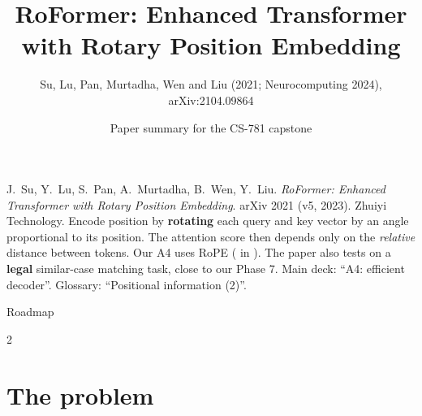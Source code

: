 \documentclass[aspectratio=169,11pt]{beamer}
\title[RoFormer / RoPE]{RoFormer: Enhanced Transformer with Rotary Position Embedding}
\subtitle{Su, Lu, Pan, Murtadha, Wen and Liu (2021; Neurocomputing 2024), arXiv:2104.09864}
\author[Paper summary]{Paper summary for the CS-781 capstone}
\date{}
\begin{document}
\begin{frame}\titlepage\end{frame}

\paperglance
{J.\ Su, Y.\ Lu, S.\ Pan, A.\ Murtadha, B.\ Wen, Y.\ Liu. \emph{RoFormer: Enhanced Transformer with Rotary Position Embedding}. arXiv 2021 (v5, 2023). Zhuiyi Technology.}
{Encode position by \textbf{rotating} each query and key vector by an angle proportional to its position. The attention score then depends only on the \emph{relative} distance between tokens.}
{Our A4 uses RoPE ( in ). The paper also tests on a \textbf{legal} similar-case matching task, close to our Phase 7.}
{Main deck: ``A4: efficient decoder''. Glossary: ``Positional information (2)''.}

\begin{frame}{Roadmap}
  \begin{multicols}{2}\small\tableofcontents\end{multicols}
\end{frame}

\section{The problem}
\end{document}
